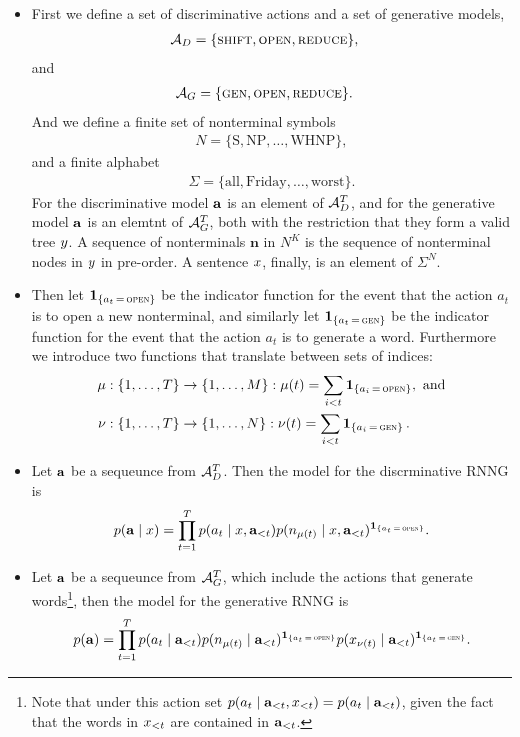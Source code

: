 \begin{itemize}
  \item First we define a set of discriminative actions and a set of generative models,
  \begin{align}
    \mathcal{A}_D &= \{ \textsc{shift}, \textsc{open}, \textsc{reduce} \},
  \end{align}
  and
  \begin{align}
    \mathcal{A}_G &= \{ \textsc{gen}, \textsc{open}, \textsc{reduce} \}.
  \end{align}
  And we define a finite set of nonterminal symbols
  \begin{align*}
    N = \{ \text{S}, \text{NP}, \dots, \text{WHNP}\},
  \end{align*}
  and a finite alphabet
  \begin{align*}
    \Sigma = \{ \text{all}, \text{Friday}, \dots, \text{worst} \}.
  \end{align*}
  For the discriminative model $\mathbf{a}$ is an element of $\mathcal{A}_D^T$, and for the generative model $\mathbf{a}$ is an elemtnt of $\mathcal{A}_G^T$, both with the restriction that they form a valid tree $y$. A sequence of nonterminals $\mathbf{n}$ in $N^K$ is the sequence of nonterminal nodes in $y$ in pre-order. A sentence $x$, finally, is an element of $\Sigma^N$.

  \item Then let $\operatorname{\mathbf{1}}_{ \{ a_t \, = \, \textsc{open} \} }$ be the indicator function for the event that the action $a_t$ is to open a new nonterminal, and similarly let $\operatorname{\mathbf{1}}_{ \{ a_t \, = \, \textsc{gen} \} }$ be the indicator function for the event that the action $a_t$ is to generate a word. Furthermore we introduce two functions that translate between sets of indices:
  \begin{align*}
    \mu &: \{ 1, \dots, T \} \to \{ 1, \dots, M \}: \mu(t) = \sum_{i < t} \operatorname{\mathbf{1}}_{ \{ a_i \, = \, \textsc{open} \} }, \text{ and}  \\
    \nu &: \{ 1, \dots, T \} \to \{ 1, \dots, N \}: \nu(t) = \sum_{i < t} \operatorname{\mathbf{1}}_{ \{ a_i \, = \, \textsc{gen} \} }.
  \end{align*}

  \item Let $\mathbf{a}$ be a sequeunce from $\mathcal{A}_D^T$. Then the model for the discrminative RNNG is
  \begin{align}
    \label{eq:disc-model}
    p(\mathbf{a} \mid x) = \prod_{t=1}^T p(a_t \mid x, \mathbf{a}_{<t}) p(n_{\mu(t)} \mid x, \mathbf{a}_{<t} )^{ \operatorname{\mathbf{1}}_{ \{ a_t \, = \, \textsc{open} \} } }.
  \end{align}
  \item Let $\mathbf{a}$ be a sequeunce from $\mathcal{A}_G^T$, which include the actions that generate words\footnote{Note that under this action set $p(a_t \mid \mathbf{a}_{<t}, x_{<t}) = p(a_t \mid \mathbf{a}_{<t})$, given the fact that the words in $x_{<t}$ are contained in $\mathbf{a}_{<t}$.}, then the model for the generative RNNG is
  \begin{align}
    \label{eq:gen-model}
    p(\mathbf{a}) = \prod_{t=1}^T p(a_t \mid \mathbf{a}_{<t}) p(n_{\mu(t)} \mid   \mathbf{a}_{<t})^{ \operatorname{\mathbf{1}}_{ \{ a_t \, = \, \textsc{open} \} } } p(x_{\nu(t)} \mid \mathbf{a}_{<t})^{ \operatorname{\mathbf{1}}_{ \{ a_t \, = \, \textsc{gen} \} } }.
  \end{align}


\end{itemize}
